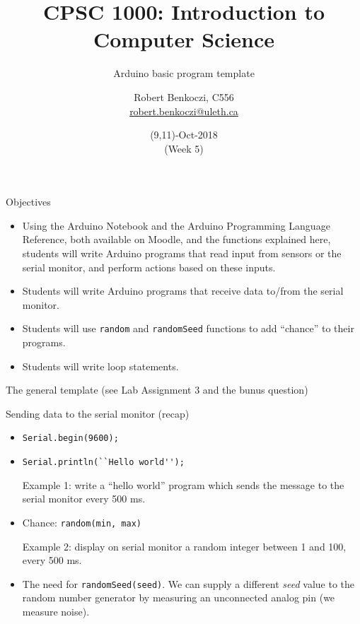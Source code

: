 \documentclass[aspectratio=1610]{beamer}
\title %
{CPSC 1000: Introduction to Computer Science}
\subtitle{Arduino basic program template} %
\author{Robert Benkoczi, C556\\\url{robert.benkoczi@uleth.ca}}
\date{(9,11)-Oct-2018\\(Week 5)}
\begin{document}
\begin{frame}[plain]
\titlepage
\end{frame}


\begin{frame}[t,plain]{Objectives}
\begin{itemize}
\item Using the Arduino Notebook and the Arduino Programming Language
  Reference, both available on Moodle, and the functions explained
  here, students will write Arduino programs that read input from
  sensors or the serial monitor, and perform actions based on these
  inputs. 
\item Students will write Arduino programs that receive data to/from
  the serial monitor.
\item Students will use \lstinline$random$ and \lstinline$randomSeed$
  functions to add ``chance'' to their programs.
\item Students will write loop statements.
\end{itemize}
\end{frame}

\begin{frame}[plain,t]{The general template (see Lab Assignment 3 and
    the bunus question)}


\end{frame}


\begin{frame}[plain,t]{Sending data to the serial monitor (recap)}

\begin{itemize}
\item \lstinline$Serial.begin(9600);$

\bigskip
\item \lstinline$Serial.println(``Hello world'');$

\smallskip
Example 1: write a ``hello world'' program which sends the message
to the serial monitor every 500 ms.

\bigskip
\bigskip
\item Chance: \lstinline$random(min, max)$

\smallskip
Example 2: display on serial monitor a random integer between 1 and
100, every 500 ms.

\bigskip
\item The need for \lstinline$randomSeed(seed)$. We can supply a different
  \emph{seed} value to the random number generator by measuring an
  unconnected analog pin (we measure noise).
\end{itemize}
\end{frame}
\end{document}
